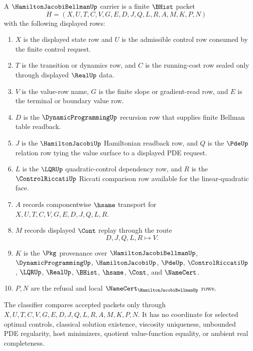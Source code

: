 \begin{definition}
\label{def:hamilton-jacobi-bellman-carrier}
A $\HamiltonJacobiBellmanUp$ carrier is a finite $\BHist$ packet
$$
H=(X,U,T,C,V,G,E,D,J,Q,L,R,A,M,K,P,N)
$$
with the following displayed rows:
\begin{enumerate}
\item $X$ is the displayed state row and $U$ is the admissible control row consumed by the finite control request.
\item $T$ is the transition or dynamics row, and $C$ is the running-cost row sealed only through displayed $\RealUp$ data.
\item $V$ is the value-row name, $G$ is the finite slope or gradient-read row, and $E$ is the terminal or boundary value row.
\item $D$ is the $\DynamicProgrammingUp$ recursion row that supplies finite Bellman table readback.
\item $J$ is the $\HamiltonJacobiUp$ Hamiltonian readback row, and $Q$ is the $\PdeUp$ relation row tying the value surface to a displayed PDE request.
\item $L$ is the $\LQRUp$ quadratic-control dependency row, and $R$ is the $\ControlRiccatiUp$ Riccati comparison row available for the linear-quadratic face.
\item $A$ records componentwise $\hsame$ transport for $X,U,T,C,V,G,E,D,J,Q,L,R$.
\item $M$ records displayed $\Cont$ replay through the route
$$
D,J,Q,L,R \longmapsto V .
$$
\item $K$ is the $\Pkg$ provenance over $\HamiltonJacobiBellmanUp$, $\DynamicProgrammingUp$, $\HamiltonJacobiUp$, $\PdeUp$, $\ControlRiccatiUp$, $\LQRUp$, $\RealUp$, $\BHist$, $\hsame$, $\Cont$, and $\NameCert$.
\item $P,N$ are the refusal and local $\NameCert_{\HamiltonJacobiBellmanUp}$ rows.
\end{enumerate}
The classifier compares accepted packets only through $X,U,T,C,V,G,E,D,J,Q,L,R,A,M,K,P,N$. It has no coordinate for selected optimal controls, classical solution existence, viscosity uniqueness, unbounded PDE regularity, host minimizers, quotient value-function equality, or ambient real completeness.
\end{definition}

